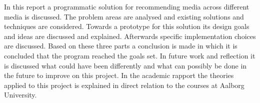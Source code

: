 In this report a programmatic solution for recommending media across different media is discussed. The problem areas are analysed and existing solutions and techniques are considered. Towards a prototype for this solution its design goals and ideas are discussed and explained. Afterwards specific implementation choices are discussed. Based on these three parts a conclusion is made in which it is concluded that the program reached the goals set. 
In future work and reflection it is discussed what could have been differently and what can possibly be done in the future to improve on this project.
In the academic rapport the theories applied to this project is explained in direct relation to the courses at Aalborg University. 